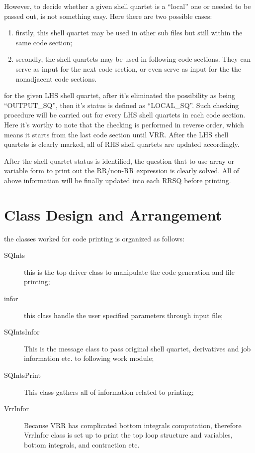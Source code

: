 However, to decide whether a given shell quartet is a ``local'' one or needed to be passed out,
is not something easy. Here there are two possible cases:
\begin{enumerate}
 \item firstly, this shell quartet may be used in other sub files but still within the same 
 code section;
 \item secondly, the shell quartets may be used in following code sections. They can serve
 as input for the next code section, or even serve as input for the the nonadjacent code 
 sections.
\end{enumerate}
for the given LHS shell quartet, after it's eliminated the possibility as being ``OUTPUT\_SQ'',
then it's status is defined as ``LOCAL\_SQ''. Such checking procedure will be carried out for every 
LHS shell quartets in each code section. Here it's worthy to note that the checking is 
performed in reverse order, which means it starts from the last code section until VRR.
After the LHS shell quartets is clearly marked, all of RHS shell quartets are updated
accordingly. 

After the shell quartet status is identified, the question that to use array or variable
form to print out the RR/non-RR expression is clearly solved. All of above information
will be finally updated into each RRSQ before printing.

\section{Class Design and Arrangement}

the classes worked for code printing is organized as follows:
\begin{description}
 \item [SQInts]  this is the top driver class to manipulate the code generation and 
 file printing;
 \item [infor]   this class handle the user specified parameters through input file;
 \item [SQIntsInfor]  This is the message class to pass original shell quartet, derivatives 
 and job information etc. to following work module;
 \item [SQIntsPrint]  This class gathers all of information related to printing;
 \item [VrrInfor] Because VRR has complicated bottom integrals computation, therefore VrrInfor
 class is set up to print the top loop structure and variables, bottom integrals, and contraction
 etc.
\end{description}

